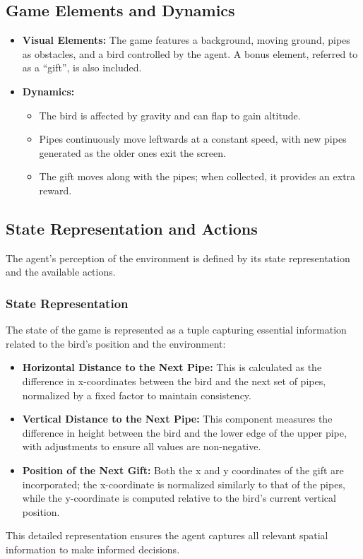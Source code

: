 \documentclass[conference]{IEEEtran}
\begin{document}
\subsection{Game Elements and Dynamics}
\begin{itemize}
    \item \textbf{Visual Elements:} The game features a background, moving ground, pipes as obstacles, and a bird controlled by the agent. A bonus element, referred to as a “gift”, is also included.
    \item \textbf{Dynamics:}
    \begin{itemize}
        \item The bird is affected by gravity and can flap to gain altitude.
        \item Pipes continuously move leftwards at a constant speed, with new pipes generated as the older ones exit the screen.
        \item The gift moves along with the pipes; when collected, it provides an extra reward.
    \end{itemize}
\end{itemize}

\subsection{State Representation and Actions}
The agent's perception of the environment is defined by its state representation and the available actions.

\subsubsection{State Representation}
The state of the game is represented as a tuple capturing essential information related to the bird's position and the environment:
\begin{itemize}
    \item \textbf{Horizontal Distance to the Next Pipe:} This is calculated as the difference in x-coordinates between the bird and the next set of pipes, normalized by a fixed factor to maintain consistency.
    \item \textbf{Vertical Distance to the Next Pipe:} This component measures the difference in height between the bird and the lower edge of the upper pipe, with adjustments to ensure all values are non-negative.
    \item \textbf{Position of the Next Gift:} Both the x and y coordinates of the gift are incorporated; the x-coordinate is normalized similarly to that of the pipes, while the y-coordinate is computed relative to the bird's current vertical position.
\end{itemize}
This detailed representation ensures the agent captures all relevant spatial information to make informed decisions.
\end{document}
